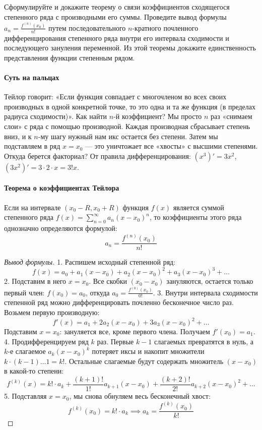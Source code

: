 
{Сформулируйте и докажите теорему о связи коэффициентов сходящегося степенного ряда с производными его суммы. Проведите вывод формулы $a_n = \frac{f^{(n)}(x_0)}{n!}$ путем последовательного $n$-кратного почленного дифференцирования степенного ряда внутри его интервала сходимости и последующего зануления переменной. Из этой теоремы докажите единственность представления функции степенным рядом.}

\paragraph{Суть на пальцах}
Тейлор говорит: «Если функция совпадает с многочленом во всех своих производных в одной конкретной точке, то это одна и та же функция (в пределах радиуса сходимости)». 
Как найти $n$-й коэффициент? Мы просто $n$ раз «снимаем слои» с ряда с помощью производной. Каждая производная сбрасывает степень вниз, и к $n$-му шагу нужный нам икс остается без степени. Затем мы подставляем в ряд $x = x_0$ — это уничтожает все «хвосты» с высшими степенями. Откуда берется факториал? От правила дифференцирования: $(x^3)' = 3x^2$, $(3x^2)' = 3 \cdot 2 \cdot x = 3!x$.


\paragraph{Теорема о коэффициентах Тейлора}
Если на интервале $(x_0 - R, x_0 + R)$ функция $f(x)$ является суммой степенного ряда $f(x) = \sum_{n=0}^\infty a_n (x-x_0)^n$, то коэффициенты этого ряда однозначно определяются формулой:
$$ a_n = \frac{f^{(n)}(x_0)}{n!} $$

\begin{proof}[Вывод формулы]
1. Распишем исходный степенной ряд:
$$ f(x) = a_0 + a_1(x-x_0) + a_2(x-x_0)^2 + a_3(x-x_0)^3 + \dots $$
2. Подставим в него $x = x_0$. Все скобки $(x_0-x_0)$ зануляются, остается только первый член: $f(x_0) = a_0$, откуда $a_0 = \frac{f^{(0)}(x_0)}{0!}$.
3. Внутри интервала сходимости степенной ряд можно дифференцировать почленно бесконечное число раз. Возьмем первую производную:
$$ f'(x) = a_1 + 2a_2(x-x_0) + 3a_3(x-x_0)^2 + \dots $$
Подставим $x = x_0$: зануляется все, кроме первого члена. Получаем $f'(x_0) = a_1$.
4. Продифференцируем ряд $k$ раз. Первые $k-1$ слагаемых превратятся в нуль, а $k$-е слагаемое $a_k(x-x_0)^k$ потеряет иксы и накопит множители $k \cdot (k-1) \dots 1 = k!$. Остальные слагаемые будут содержать множитель $(x-x_0)$ в какой-то степени:
$$ f^{(k)}(x) = k! \cdot a_k + \frac{(k+1)!}{1!} a_{k+1}(x-x_0) + \frac{(k+2)!}{2!} a_{k+2}(x-x_0)^2 + \dots $$
5. Подставляя $x = x_0$, мы снова обнуляем весь бесконечный хвост:
$$ f^{(k)}(x_0) = k! \cdot a_k \implies a_k = \frac{f^{(k)}(x_0)}{k!} $$
\end{proof}

